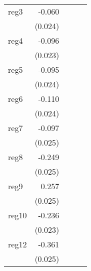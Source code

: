 {\begin{longtable}{l*{4}{D{.}{.}{-1}}}
\addlinespace
reg3        &      -0.060\sym{*}  &                     &                     &                     \\
            &     (0.024)         &                     &                     &                     \\
\addlinespace
reg4        &      -0.096\sym{***}&                     &                     &                     \\
            &     (0.023)         &                     &                     &                     \\
\addlinespace
reg5        &      -0.095\sym{***}&                     &                     &                     \\
            &     (0.024)         &                     &                     &                     \\
\addlinespace
reg6        &      -0.110\sym{***}&                     &                     &                     \\
            &     (0.024)         &                     &                     &                     \\
\addlinespace
reg7        &      -0.097\sym{***}&                     &                     &                     \\
            &     (0.025)         &                     &                     &                     \\
\addlinespace
reg8        &      -0.249\sym{***}&                     &                     &                     \\
            &     (0.025)         &                     &                     &                     \\
\addlinespace
reg9        &       0.257\sym{***}&                     &                     &                     \\
            &     (0.025)         &                     &                     &                     \\
\addlinespace
reg10       &      -0.236\sym{***}&                     &                     &                     \\
            &     (0.023)         &                     &                     &                     \\
\addlinespace
reg12       &      -0.361\sym{***}&                     &                     &                     \\
            &     (0.025)         &                     &                     &                     \\

\end{longtable}}

